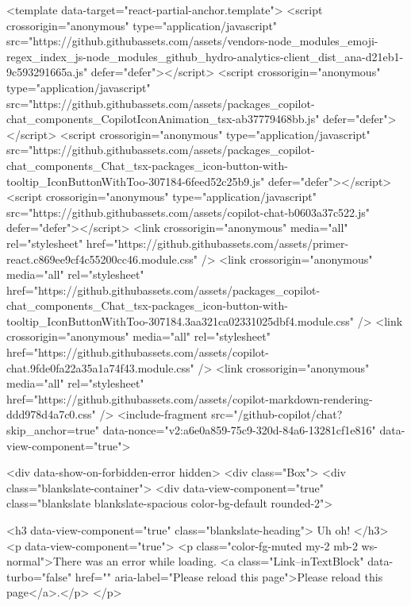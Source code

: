       <template data-target="react-partial-anchor.template">
        <script crossorigin="anonymous" type="application/javascript" src="https://github.githubassets.com/assets/vendors-node_modules_emoji-regex_index_js-node_modules_github_hydro-analytics-client_dist_ana-d21eb1-9c593291665a.js" defer="defer"></script>
<script crossorigin="anonymous" type="application/javascript" src="https://github.githubassets.com/assets/packages_copilot-chat_components_CopilotIconAnimation_tsx-ab37779468bb.js" defer="defer"></script>
<script crossorigin="anonymous" type="application/javascript" src="https://github.githubassets.com/assets/packages_copilot-chat_components_Chat_tsx-packages_icon-button-with-tooltip_IconButtonWithToo-307184-6feed52c25b9.js" defer="defer"></script>
<script crossorigin="anonymous" type="application/javascript" src="https://github.githubassets.com/assets/copilot-chat-b0603a37c522.js" defer="defer"></script>
<link crossorigin="anonymous" media="all" rel="stylesheet" href="https://github.githubassets.com/assets/primer-react.c869ee9cf4c55200cc46.module.css" />
<link crossorigin="anonymous" media="all" rel="stylesheet" href="https://github.githubassets.com/assets/packages_copilot-chat_components_Chat_tsx-packages_icon-button-with-tooltip_IconButtonWithToo-307184.3aa321ca02331025dbf4.module.css" />
<link crossorigin="anonymous" media="all" rel="stylesheet" href="https://github.githubassets.com/assets/copilot-chat.9fde0fa22a35a1a74f43.module.css" />
        <link crossorigin="anonymous" media="all" rel="stylesheet" href="https://github.githubassets.com/assets/copilot-markdown-rendering-ddd978d4a7c0.css" />
        <include-fragment src="/github-copilot/chat?skip_anchor=true" data-nonce="v2:a6e0a859-75c9-320d-84a6-13281cf1e816" data-view-component="true">
  
  <div data-show-on-forbidden-error hidden>
    <div class="Box">
  <div class="blankslate-container">
    <div data-view-component="true" class="blankslate blankslate-spacious color-bg-default rounded-2">
      

      <h3 data-view-component="true" class="blankslate-heading">        Uh oh!
</h3>
      <p data-view-component="true">        <p class="color-fg-muted my-2 mb-2 ws-normal">There was an error while loading. <a class="Link--inTextBlock" data-turbo="false" href="" aria-label="Please reload this page">Please reload this page</a>.</p>
</p>

